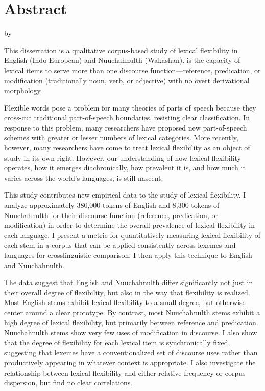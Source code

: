 \clearpage
{}
\section*{Abstract}
\label{sec:abstract}

\begin{center}

  \doctitle

  by

  \theauthor

\end{center}

This dissertation is a qualitative corpus-based study of lexical flexibility in English (Indo-European) and Nuuchahnulth (Wakashan).  is the capacity of lexical items to serve more than one discourse function—reference, predication, or modification (traditionally noun, verb, or adjective) with no overt derivational morphology.

Flexible words pose a problem for many theories of parts of speech because they cross-cut traditional part-of-speech boundaries, resisting clear classification. In response to this problem, many researchers have proposed new part-of-speech schemes with greater or lesser numbers of lexical categories. More recently, however, many researchers have come to treat lexical flexibility as an object of study in its own right. However, our understanding of how lexical flexibility operates, how it emerges diachronically, how prevalent it is, and how much it varies across the world's languages, is still nascent.

This study contributes new empirical data to the study of lexical flexibility. I analyze approximately 380,000 tokens of English and 8,300 tokens of Nuuchahnulth for their discourse function (reference, predication, or modification) in order to determine the overall prevalence of lexical flexibility in each language. I present a metric for quantitatively measuring lexical flexibility of each stem in a corpus that can be applied consistently across lexemes and languages for crosslinguistic comparison. I then apply this technique to English and Nuuchahnulth.

The data suggest that English and Nuuchahnulth differ significantly not just in their overall degree of flexibility, but also in the way that flexibility is realized. Most English stems exhibit lexical flexibility to a small degree, but otherwise center around a clear prototype. By contrast, most Nuuchahnulth stems exhibit a high degree of lexical flexibility, but primarily between reference and predication. Nuuchahnulth stems show very few uses of modification in discourse. I also show that the degree of flexibility for each lexical item is synchronically fixed, suggesting that lexemes have a conventionalized set of discourse uses rather than productively appearing in whatever context is appropriate. I also investigate the relationship between lexical flexibility and either relative frequency or corpus dispersion, but find no clear correlations.

